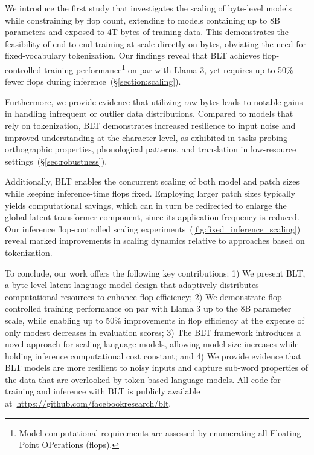 We introduce the first study that investigates the scaling of byte-level models while constraining by flop count, extending to models containing up to 8B parameters and exposed to 4T bytes of training data. This demonstrates the feasibility of end-to-end training at scale directly on bytes, obviating the need for fixed-vocabulary tokenization. Our findings reveal that {\textsc BLT} achieves flop-controlled training performance\footnote{Model computational requirements are assessed by enumerating all Floating Point OPerations (flops).} on par with Llama 3, yet requires up to 50\% fewer flops during inference~(\S\ref{section:scaling}).

Furthermore, we provide evidence that utilizing raw bytes leads to notable gains in handling infrequent or outlier data distributions. Compared to models that rely on tokenization, {\textsc BLT} demonstrates increased resilience to input noise and improved understanding at the character level, as exhibited in tasks probing orthographic properties, phonological patterns, and translation in low-resource settings~(\S\ref{sec:robustness}).

Additionally, {\textsc BLT} enables the concurrent scaling of both model and patch sizes while keeping inference-time flops fixed. Employing larger patch sizes typically yields computational savings, which can in turn be redirected to enlarge the global latent transformer component, since its application frequency is reduced. Our inference flop-controlled scaling experiments~(\autoref{fig:fixed_inference_scaling}) reveal marked improvements in scaling dynamics relative to approaches based on tokenization.

To conclude, our work offers the following key contributions: 1) We present {\textsc BLT}, a byte-level latent language model design that adaptively distributes computational resources to enhance flop efficiency; 2) We demonstrate flop-controlled training performance on par with Llama 3 up to the 8B parameter scale, while enabling up to 50\% improvements in flop efficiency at the expense of only modest decreases in evaluation scores; 3) The {\textsc BLT} framework introduces a novel approach for scaling language models, allowing model size increases while holding inference computational cost constant; and 4) We provide evidence that {\textsc BLT} models are more resilient to noisy inputs and capture sub-word properties of the data that are overlooked by token-based language models. All code for training and inference with {\textsc BLT} is publicly available at~\url{https://github.com/facebookresearch/blt}.

